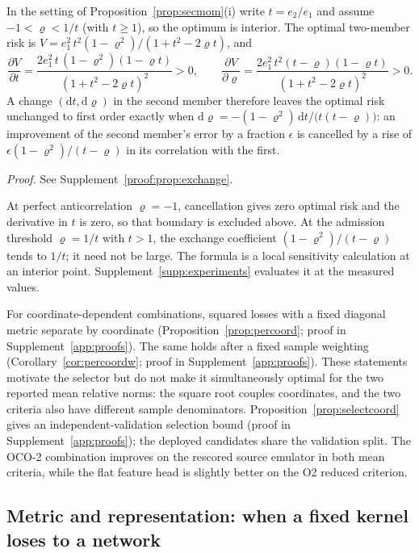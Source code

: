 \begin{proposition}\label{prop:exchange}
In the setting of Proposition~\ref{prop:secmom}(i) write $t=e_2/e_1$ and
assume $-1<\varrho<1/t$ (with $t\ge1$), so the optimum is interior. The optimal
two-member risk is $V=e_1^2\,t^2(1-\varrho^2)/(1+t^2-2\varrho t)$, and
\[
\frac{\partial V}{\partial t}
=\frac{2e_1^2\,t\,(1-\varrho^2)(1-\varrho t)}{(1+t^2-2\varrho t)^2}>0,
\qquad
\frac{\partial V}{\partial\varrho}
=\frac{2e_1^2\,t^2(t-\varrho)(1-\varrho t)}{(1+t^2-2\varrho t)^2}>0 .
\]
A change $(\mathrm dt,\mathrm d\varrho)$ in the second member therefore
leaves the optimal risk unchanged to first order exactly when
$\mathrm d\varrho=-(1-\varrho^2)\,\mathrm dt/\big(t(t-\varrho)\big)$: an
improvement of the second member's error by a fraction $\epsilon$ is
cancelled by a rise of $\epsilon(1-\varrho^2)/(t-\varrho)$ in its correlation
with the first.
\end{proposition}
\noindent\emph{Proof.} See Supplement~\ref{proof:prop:exchange}.


At perfect anticorrelation $\varrho=-1$, cancellation gives zero optimal risk and the derivative in $t$ is zero, so that boundary is excluded above. At the admission threshold $\varrho=1/t$ with $t>1$, the exchange coefficient $(1-\varrho^2)/(t-\varrho)$ tends to $1/t$; it need not be large. The formula is a local sensitivity calculation at an interior point. Supplement~\ref{supp:experiments} evaluates it at the measured values.

For coordinate-dependent combinations, squared losses with a fixed diagonal metric separate by coordinate (Proposition~\ref{prop:percoord}; proof in Supplement~\ref{app:proofs}). The same holds after a fixed sample weighting (Corollary~\ref{cor:percoordw}; proof in Supplement~\ref{app:proofs}). These statements motivate the selector but do not make it simultaneously optimal for the two reported mean relative norms: the square root couples coordinates, and the two criteria also have different sample denominators. Proposition~\ref{prop:selectcoord} gives an independent-validation selection bound (proof in Supplement~\ref{app:proofs}); the deployed candidates share the validation split. The OCO-2 combination improves on the rescored source emulator in both mean criteria, while the flat feature head is slightly better on the O2 reduced criterion.

\subsection{Metric and representation: when a fixed kernel loses to a network}
\label{sec:theory-aniso}

